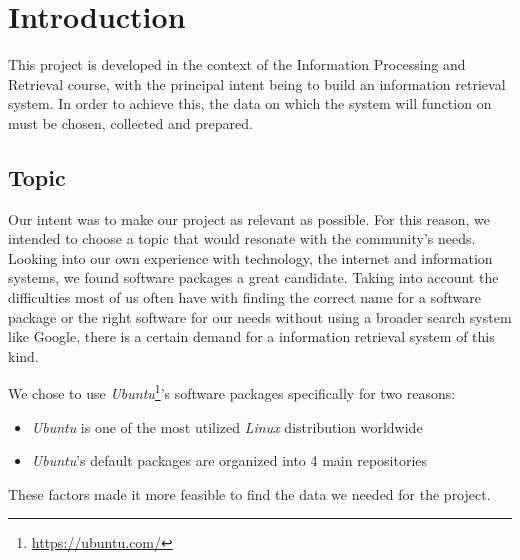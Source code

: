 \section{Introduction}
\label{sec:Introduction}

This project is developed in the context of the Information Processing and Retrieval course, with the principal intent being to build an information retrieval system. In order to achieve this, the data on which the system will function on must be chosen, collected and prepared.   

\subsection{Topic}

Our intent was to make our project as relevant as possible. For this reason, we intended to choose a topic that would resonate with the community's needs. Looking into our own experience with technology, the internet and information systems, we found software packages a great candidate. Taking into account the difficulties most of us often have with finding the correct name for a software package or the right software for our needs without using a broader search system like Google, there is a certain demand for a information retrieval system of this kind. 

We chose to use \emph{Ubuntu}\footnote{\url{https://ubuntu.com/}}'s software packages specifically for two reasons:

\begin{itemize}
    \item \emph{Ubuntu} is one of the most utilized \emph{Linux} distribution worldwide
    \item \emph{Ubuntu}'s default packages are organized into 4 main repositories
\end{itemize}

These factors made it more feasible to find the data we needed for the project.



